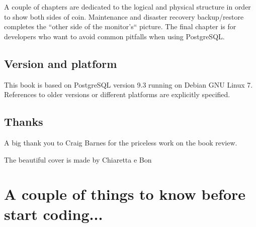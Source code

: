 \documentclass[oneside]{book}
\begin{document}
A couple of chapters are dedicated to the logical and physical structure in
order to show both sides of coin.  Maintenance and disaster recovery
backup/restore completes the ``other side of the monitor's`` picture.
The final chapter is for developers who want to avoid common pitfalls when
using PostgreSQL.

\section*{Version and platform}
This book is based on PostgreSQL version 9.3 running on Debian GNU Linux 7.
References to older versions or different platforms are explicitly specified.

\section*{Thanks}
A big thank you to Craig Barnes for the priceless work on the book review.\newline

The beautiful cover is made by Chiaretta e Bon 











\chapter{A couple of things to know before start coding...}
\label{cha:COUPLETHINGS}
%

\appendix

\listoffigures
\listoftables
\printindex{}
\end{document}
